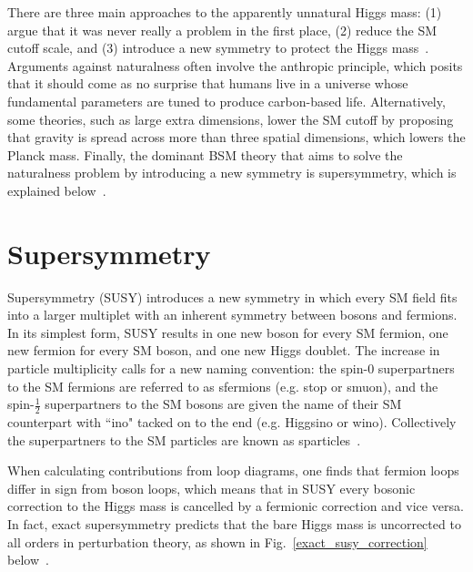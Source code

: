 \documentclass[12pt]{article}
\begin{document}
     There are three main approaches to the apparently unnatural Higgs mass: (1) argue that it was never really a problem in the first place, (2) reduce the SM cutoff scale, and (3) introduce a new symmetry to protect the Higgs mass~\cite{craig}. Arguments against naturalness often involve the anthropic principle, which posits that it should come as no surprise that humans live in a universe whose fundamental parameters are tuned to produce carbon-based life. Alternatively, some theories, such as large extra dimensions, lower the SM cutoff by proposing that gravity is spread across more than three spatial dimensions, which lowers the Planck mass. Finally, the dominant BSM theory that aims to solve the naturalness problem by introducing a new symmetry is supersymmetry, which is explained below~\cite{dine_naturalness}.
    
\section{Supersymmetry}

    Supersymmetry (SUSY) introduces a new symmetry in which every SM field fits into a larger multiplet with an inherent symmetry between bosons and fermions. In its simplest form, SUSY results in one new boson for every SM fermion, one new fermion for every SM boson, and one new Higgs doublet. The increase in particle multiplicity calls for a new naming convention: the spin-0 superpartners to the SM fermions are referred to as sfermions (e.g. stop or smuon), and the spin-$\frac{1}{2}$ superpartners to the SM bosons are given the name of their SM counterpart with ``ino" tacked on to the end (e.g. Higgsino or wino). Collectively the superpartners to the SM particles are known as sparticles~\cite{primer}.

    When calculating contributions from loop diagrams, one finds that fermion loops differ in sign from boson loops, which means that in SUSY every bosonic correction to the Higgs mass is cancelled by a fermionic correction and vice versa. In fact, exact supersymmetry predicts that the bare Higgs mass is uncorrected to all orders in perturbation theory, as shown in Fig.~\ref{exact_susy_correction} below~\cite{primer}.
    
\end{document}
